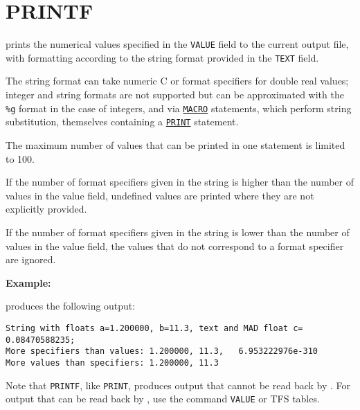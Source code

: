 \section{PRINTF}
\label{sec:printf}
prints the numerical values specified in the \texttt{VALUE} field to the
current output file, with formatting according to the string format
provided in the \texttt{TEXT} field. 

The string format can take numeric C or \madx format specifiers for
double real values; integer and string formats are not supported but 
can be approximated with the \texttt{\%g} format in the case of
integers, and via \hyperref[sec:macro]{\texttt{MACRO}} statements, which
perform string substitution, themselves containing a
\hyperref[sec:print]{\texttt{PRINT}} statement.   

The maximum number of values that can be printed in one
statement is limited to 100. 

If the number of format specifiers given in the string is higher 
than the number of values in the value field, undefined values are
printed where they are not explicitly provided. 

If the number of format specifiers given in the string is lower 
than the number of values in the value field, the values that 
do not correspond to a format specifier are ignored. 


\textbf{Example:}
{\small
{}}

produces the following output:
\begin{verbatim}
String with floats a=1.200000, b=11.3, text and MAD float c=  0.08470588235;
More specifiers than values: 1.200000, 11.3,   6.953222976e-310
More values than specifiers: 1.200000, 11.3
\end{verbatim}

Note that \texttt{PRINTF}, like \texttt{PRINT}, produces output that
cannot be read back by \madx. For output that can be read back by \madx,
use the command \texttt{VALUE} or TFS tables.

